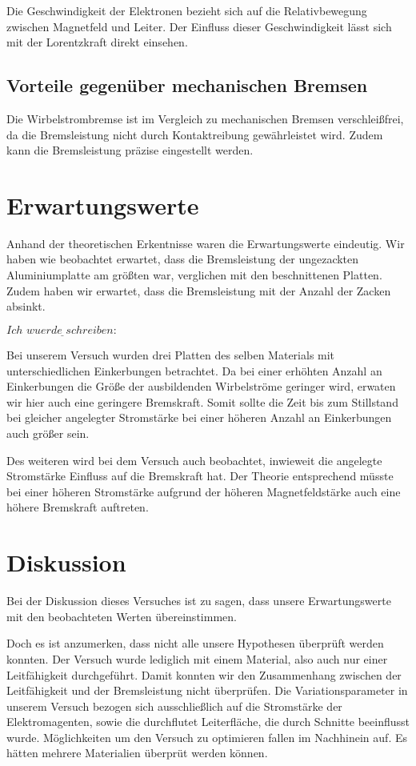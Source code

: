 Die Geschwindigkeit der Elektronen bezieht sich auf die
Relativbewegung zwischen Magnetfeld und Leiter. Der Einfluss dieser
Geschwindigkeit lässt sich mit der Lorentzkraft direkt einsehen.

\subsection{Vorteile gegenüber mechanischen Bremsen}

Die Wirbelstrombremse ist im Vergleich zu mechanischen Bremsen
verschleißfrei, da die Bremsleistung nicht durch Kontaktreibung
gewährleistet wird. Zudem kann die Bremsleistung präzise eingestellt
werden.

\section{Erwartungswerte}

Anhand der theoretischen Erkentnisse waren die Erwartungswerte eindeutig.
Wir haben wie beobachtet erwartet, dass die Bremsleistung der
ungezackten Aluminiumplatte am größten war, verglichen mit den
beschnittenen Platten.
Zudem haben wir erwartet, dass die Bremsleistung mit der Anzahl der
Zacken absinkt.

$\underline{Ich \,\, wuerde \,\, schreiben: }$

Bei unserem Versuch wurden drei Platten des selben Materials mit unterschiedlichen
Einkerbungen betrachtet. Da bei einer erhöhten Anzahl an Einkerbungen die Größe
der ausbildenden Wirbelströme geringer wird, erwaten wir hier auch eine geringere
Bremskraft. Somit sollte die Zeit bis zum Stillstand bei gleicher angelegter
Stromstärke bei einer höheren Anzahl an Einkerbungen auch größer sein.

Des weiteren wird bei dem Versuch auch beobachtet, inwieweit die angelegte
Stromstärke Einfluss auf die Bremskraft hat. Der Theorie entsprechend müsste
bei einer höheren Stromstärke aufgrund der höheren Magnetfeldstärke auch eine
höhere Bremskraft auftreten.

\section{Diskussion}

Bei der Diskussion dieses Versuches ist zu sagen, dass unsere Erwartungswerte
mit den beobachteten Werten übereinstimmen.

Doch es ist anzumerken, dass nicht alle unsere Hypothesen überprüft
werden konnten.
Der Versuch wurde lediglich mit einem Material, also auch nur einer
Leitfähigkeit durchgeführt. Damit konnten wir den Zusammenhang
zwischen der Leitfähigkeit und der Bremsleistung nicht überprüfen.
Die Variationsparameter in unserem Versuch bezogen sich
ausschließlich auf die Stromstärke der Elektromagenten, sowie
die durchflutet Leiterfläche, die durch Schnitte beeinflusst wurde.
Möglichkeiten um den Versuch zu optimieren fallen im Nachhinein auf.
Es hätten mehrere Materialien überprüt werden können.


